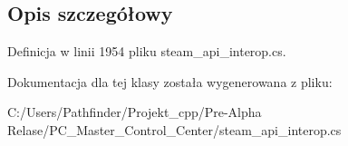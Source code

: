 \subsection{Opis szczegółowy}


Definicja w linii 1954 pliku steam\+\_\+api\+\_\+interop.\+cs.



Dokumentacja dla tej klasy została wygenerowana z pliku\+:\begin{DoxyCompactItemize}
\item 
C\+:/\+Users/\+Pathfinder/\+Projekt\+\_\+cpp/\+Pre-\/\+Alpha Relase/\+P\+C\+\_\+\+Master\+\_\+\+Control\+\_\+\+Center/steam\+\_\+api\+\_\+interop.\+cs\end{DoxyCompactItemize}
